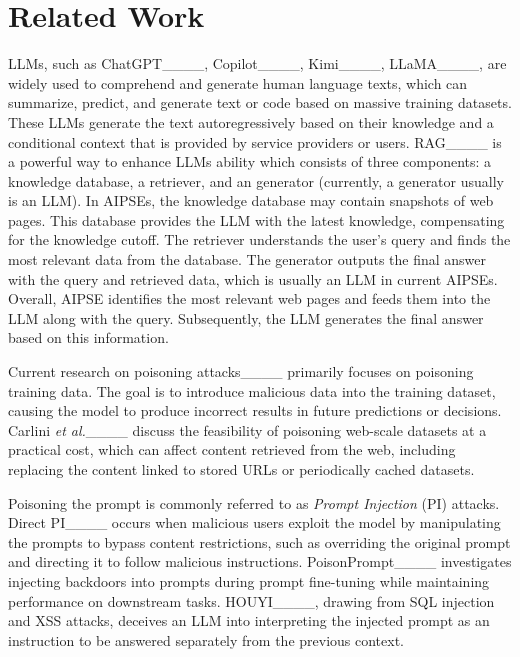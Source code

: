 \section{Related Work}
\label{sec:bg}

LLMs, such as ChatGPT____, Copilot____, Kimi____, LLaMA____, are widely used to comprehend and generate human language texts, which can summarize, predict, and generate text or code based on massive training datasets.
These LLMs generate the text autoregressively based on their knowledge and a conditional context that is provided by service providers or users.
RAG____ is a powerful way to enhance LLMs ability which consists of three components: a knowledge database, a retriever, and an generator (currently, a generator usually is an LLM).
In AIPSEs, the knowledge database may contain snapshots of web pages.
This database provides the LLM with the latest knowledge, compensating for the knowledge cutoff.
The retriever understands the user's query and finds the most relevant data from the database.
The generator outputs the final answer with the query and retrieved data, which is usually an LLM in current AIPSEs.
Overall, AIPSE identifies the most relevant web pages and feeds them into the LLM along with the query. 
Subsequently, the LLM generates the final answer based on this information.

 Current research on poisoning attacks____ primarily focuses on poisoning training data.
The goal is to introduce malicious data into the training dataset, causing the model to produce incorrect results in future predictions or decisions.
Carlini \textit{et al.}____ discuss the feasibility of poisoning web-scale datasets at a practical cost, which can affect content retrieved from the web, including replacing the content linked to stored URLs or periodically cached datasets.

Poisoning the prompt is commonly referred to as \textit{Prompt Injection} (PI) attacks.
Direct PI____ occurs when malicious users exploit the model by manipulating the prompts to bypass content restrictions, such as overriding the original prompt and directing it to follow malicious instructions.
PoisonPrompt____ investigates injecting backdoors into prompts during prompt fine-tuning while maintaining performance on downstream tasks.
HOUYI____, drawing from SQL injection and XSS attacks, deceives an LLM into interpreting the injected prompt as an instruction to be answered separately from the previous context.

